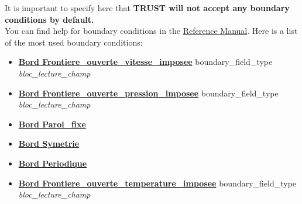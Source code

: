     \begin{center}
    \end{center}

It is important to specify here that \textbf{TRUST will not accept any boundary conditions by default.}\\

You can find help for boundary conditions in the \href{\REFERENCEMANUAL\#condlimbase}{\trustref Reference Manual}.
Here is a list of the most used boundary conditions:
{\small{
\begin{itemize}
\item \href{\REFERENCEMANUAL\#frontiereouvertevitesseimposee}{\textbf{Bord Frontiere\_ouverte\_vitesse\_imposee}}    boundary\_field\_type \textit{bloc\_lecture\_champ}
\item \href{\REFERENCEMANUAL\#frontiereouvertepressionimposee}{\textbf{Bord Frontiere\_ouverte\_pression\_imposee}}   boundary\_field\_type \textit{bloc\_lecture\_champ}
\item \href{\REFERENCEMANUAL\#paroifixe}{\textbf{Bord Paroi\_fixe}}
\item \href{\REFERENCEMANUAL\#symetrie}{\textbf{Bord Symetrie}}
\item \href{\REFERENCEMANUAL\#periodic}{\textbf{Bord Periodique}}
\item \href{\REFERENCEMANUAL\#frontiereouvertetemperatureimposee}{\textbf{Bord Frontiere\_ouverte\_temperature\_imposee}}                        boundary\_field\_type \textit{bloc\_lecture\_champ}

\end{itemize}}}
